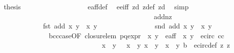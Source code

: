 \begin{isabellebody}
\ \isamarkupfalse%
\ {\isacharquery}thesis\ \isanewline
\ \ \ \ \ \ \ \ \ \ \ \ \ \ \ \ \isamarkupfalse%
\ e{\isacharunderscore}aff{\isacharunderscore}def\ \isamarkupfalse%
\ e{\isacharunderscore}e{\isacharprime}{\isacharunderscore}iff\ z{}{\isacharunderscore}d\ z{}{\isacharunderscore}def\ z{}{\isacharunderscore}d\ \isamarkupfalse%
\ simp\isanewline
\ \ \ \ \ \ \ \ \ \ \ \ \isamarkupfalse%
\ \ \ \ \ \ \isanewline
\isanewline
\ \ \ \ \ \ \ \ \ \ \ \ \ \ \ \ \ \ \ \ \ \ \ \ \ \isanewline
\ \ \ \ \ \ \ \ \ \ \ \ \isamarkupfalse%
\ add{\isacharunderscore}nz{\isacharcolon}\ \isanewline
\ \ \ \ \ \ \ \ \ \ \ \ \ \ {\isachardoublequoteopen}fst\ {\isacharparenleft}add\ {\isacharparenleft}x{\isacharcomma}\ y{\isacharparenright}\ {\isacharparenleft}{\isasymtau}\ {\isacharparenleft}x{\isacharprime}{\isacharcomma}\ y{\isacharprime}{\isacharparenright}{\isacharparenright}{\isacharparenright}\ {\isasymnoteq}\ {}{\isachardoublequoteclose}\isanewline
\ \ \ \ \ \ \ \ \ \ \ \ \ \ {\isachardoublequoteopen}snd\ {\isacharparenleft}add\ {\isacharparenleft}x{\isacharcomma}\ y{\isacharparenright}\ {\isacharparenleft}{\isasymtau}\ {\isacharparenleft}x{\isacharprime}{\isacharcomma}\ y{\isacharprime}{\isacharparenright}{\isacharparenright}{\isacharparenright}\ {\isasymnoteq}\ {}{\isachardoublequoteclose}\isanewline
\ \ \ \ \ \ \ \ \ \ \ \ \ \ \isamarkupfalse%
\ b{\isacharunderscore}cc{\isacharunderscore}case{\isacharbrackleft}OF\ closure{\isacharunderscore}lem\ p{\isacharunderscore}q{\isacharunderscore}expr{\isacharparenleft}{}{\isacharparenright}\ {\isacartoucheopen}{\isasymtau}\ {\isacharparenleft}x{\isacharprime}{\isacharcomma}\ y{\isacharprime}{\isacharparenright}\ {\isasymin}\ e{\isacharunderscore}aff{\isacartoucheclose}\ {\isacartoucheopen}{\isasymtau}\ {\isacharparenleft}x{\isacharprime}{\isacharcomma}\ y{\isacharprime}{\isacharparenright}\ {\isasymin}\ e{\isacharunderscore}circ{\isacartoucheclose}\ cc\isanewline
\ \ \ \ \ \ \ \ \ \ \ \ \ \ \ \ \ \ \ \ \ \ \ \ \ \ \ \ \ \ \ {\isacartoucheopen}x{\isacharprime}\ {\isacharasterisk}\ y{\isacharprime}\ {\isasymnoteq}\ {\isacharminus}\ x\ {\isacharasterisk}\ y{\isacartoucheclose}\ {\isacartoucheopen}x{\isacharprime}\ {\isacharasterisk}\ y{\isacharprime}\ {\isasymnoteq}\ x\ {\isacharasterisk}\ y{\isacartoucheclose}\ b{\isacharparenleft}{}{\isacharparenright}{\isacharbrackright}\ \ e{\isacharunderscore}circ{\isacharunderscore}def\ z{}{\isacharparenleft}{}{\isacharparenright}\ z{}{\isacharparenleft}{}{\isacharparenright}\ \isanewline

\end{isabellebody}
